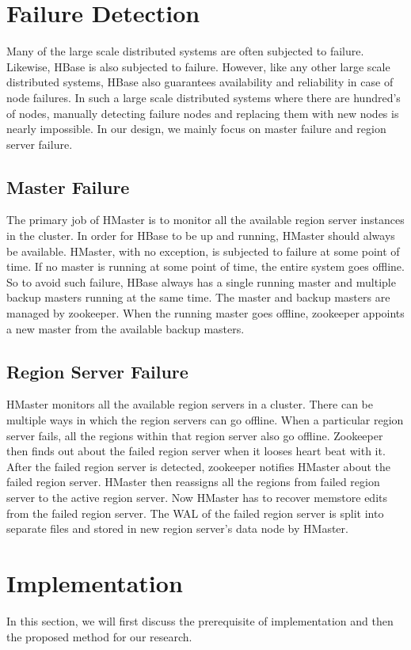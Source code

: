 \documentclass[11pt,a4paper,bibtotoc,idxtotoc,headsepline,footsepline,footexclude,BCOR12mm,DIV13]{scrbook}
\begin{document}
\chapter{Failure Detection}
\label{Failure Detection}
Many of the large scale distributed systems are often subjected to failure. Likewise, HBase is also subjected to failure. However, like any other large scale distributed systems, HBase also guarantees availability and reliability in case of node failures. In such a large scale distributed systems where there are hundred's of nodes, manually detecting failure nodes and replacing them with new nodes is nearly impossible. In our design, we mainly focus on master failure and region server failure.

\section{Master Failure}
\label{Master Failure}
The primary job of HMaster is to monitor all the available region server instances in the cluster. In order for HBase to be up and running, HMaster should always be available. HMaster, with no exception, is subjected to failure at some point of time. If no master is running at some point of time, the entire system goes offline. So to avoid such failure, HBase always has a single running master and multiple backup masters running at the same time. The master and backup masters are managed by zookeeper. When the running master goes offline, zookeeper appoints a new master from the available backup masters.

\section{Region Server Failure}
\label{Region Server Failure}
HMaster monitors all the available region servers in a cluster. There can be multiple ways in which the region servers can go offline. When a particular region server fails, all the regions within that region server also go offline. Zookeeper then finds out about the failed region server when it looses heart beat with it. After the failed region server is detected, zookeeper notifies HMaster about the failed region server. HMaster then reassigns all the regions from failed region server to the active region server. Now HMaster has to recover memstore edits from the failed region server. The WAL of the failed region server is split into separate files and stored in new region server's data node by HMaster.


\chapter{Implementation}
\label{Implementation}
In this section, we will first discuss the prerequisite of implementation and then the proposed method for our research.
\end{document}
